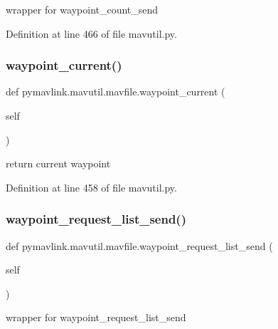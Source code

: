 \begin{DoxyVerb}wrapper for waypoint_count_send\end{DoxyVerb}
 

Definition at line 466 of file mavutil.\+py.

\mbox{\label{classpymavlink_1_1mavutil_1_1mavfile_aba2948f65c3186269715ffcb4b7ddce5}} 
\subsubsection{\texorpdfstring{waypoint\_current()}{waypoint\_current()}}
{\footnotesize\ttfamily def pymavlink.\+mavutil.\+mavfile.\+waypoint\+\_\+current (\begin{DoxyParamCaption}\item[{}]{self }\end{DoxyParamCaption})}

\begin{DoxyVerb}return current waypoint\end{DoxyVerb}
 

Definition at line 458 of file mavutil.\+py.

\mbox{\label{classpymavlink_1_1mavutil_1_1mavfile_a49ca013cb65639e9c5a5a436cb0a7756}} 
\subsubsection{\texorpdfstring{waypoint\_request\_list\_send()}{waypoint\_request\_list\_send()}}
{\footnotesize\ttfamily def pymavlink.\+mavutil.\+mavfile.\+waypoint\+\_\+request\+\_\+list\+\_\+send (\begin{DoxyParamCaption}\item[{}]{self }\end{DoxyParamCaption})}

\begin{DoxyVerb}wrapper for waypoint_request_list_send\end{DoxyVerb}
 

